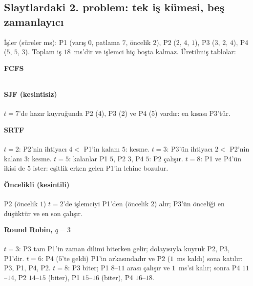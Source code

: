 \documentclass[11pt,a4paper]{article}
\begin{document}
\subsection{Slaytlardaki 2. problem: tek iş kümesi, beş zamanlayıcı}
İşler (süreler ms): P1 (varış $0$, patlama $7$, öncelik $2$), P2 ($2$, $4$, $1$), P3 ($3$, $2$, $4$), P4 ($5$, $5$, $3$). Toplam iş $18$~ms'dir ve işlemci hiç boşta kalmaz. Üretilmiş tablolar:

\textbf{FCFS}\\[0.2em]
\\[0.3em]
{\small{}}

\textbf{SJF (kesintisiz)}\\[0.2em]
\\[0.3em]
$t=7$'de hazır kuyruğunda P2 (4), P3 (2) ve P4 (5) vardır: en kısası P3'tür.\\
{\small{}}

\textbf{SRTF}\\[0.2em]
\\[0.3em]
$t=2$: P2'nin ihtiyacı $4 <$ P1'in kalanı $5$: kesme. $t=3$: P3'ün ihtiyacı $2 <$ P2'nin kalanı $3$: kesme. $t=5$: kalanlar P1 $5$, P2 $3$, P4 $5$: P2 çalışır. $t=8$: P1 ve P4'ün ikisi de $5$ ister: eşitlik erken gelen P1'in lehine bozulur.\\
{\small{}}

\textbf{Öncelikli (kesintili)}\\[0.2em]
\\[0.3em]
P2 (öncelik $1$) $t=2$'de işlemciyi P1'den (öncelik $2$) alır; P3'ün önceliği en düşüktür ve en son çalışır.\\
{\small{}}

\textbf{Round Robin, $q = 3$}\\[0.2em]
\\[0.3em]
$t=3$: P3 tam P1'in zaman dilimi biterken gelir; dolayısıyla kuyruk P2, P3, P1'dir. $t=6$: P4 ($5$'te geldi) P1'in arkasındadır ve P2 ($1$~ms kaldı) sona katılır: P3, P1, P4, P2. $t=8$: P3 biter; P1 $8$--$11$ arası çalışır ve $1$~ms'si kalır; sonra P4 $11$--$14$, P2 $14$--$15$ (biter), P1 $15$--$16$ (biter), P4 $16$--$18$.\\
{\small{}}
\end{document}
